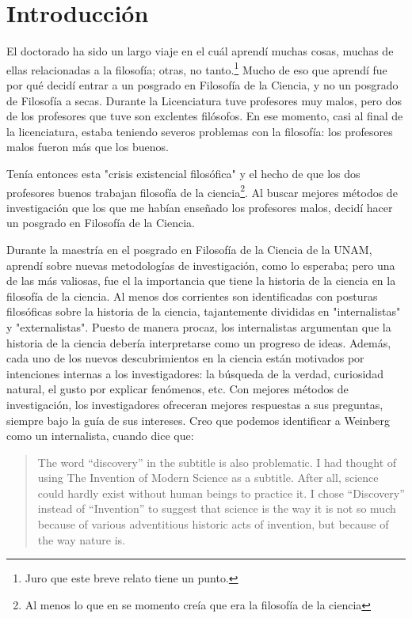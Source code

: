 
\chapter{Introducción}
\label{ch:introduction}

\dochaptoc %

El doctorado ha sido un largo viaje en el cuál aprendí muchas cosas, muchas de ellas relacionadas a la filosofía; otras, no tanto.\footnote{Juro que este breve relato tiene un punto.}
Mucho de eso que aprendí fue por qué decidí entrar a un posgrado en Filosofía de la Ciencia, y no un posgrado de Filosofía a secas.
Durante la Licenciatura tuve profesores muy malos, pero dos de los profesores que tuve son exclentes filósofos.
En ese momento, casi al final de la licenciatura, estaba teniendo severos problemas con la filosofía: los profesores malos fueron más que los buenos.

Tenía entonces esta "crisis existencial filosófica" y el hecho de que los dos profesores buenos trabajan filosofía de la ciencia\footnote{Al menos lo que en se momento creía que era la filosofía de la ciencia}.
Al buscar mejores métodos de investigación que los que me habían enseñado los profesores malos, decidí hacer un posgrado en Filosofía de la Ciencia.

Durante la maestría en el posgrado en Filosofía de la Ciencia de la UNAM, aprendí sobre nuevas metodologías de investigación, como lo esperaba; pero una de las más valiosas, fue el la importancia que tiene la historia de la ciencia en la filosofía de la ciencia.
Al menos dos corrientes son identificadas con posturas filosóficas sobre la historia de la ciencia, tajantemente divididas en "internalistas" y "externalistas".
Puesto de manera procaz, los internalistas argumentan que la historia de la ciencia debería interpretarse como un progreso de ideas.
Además, cada uno de los nuevos descubrimientos en la ciencia están motivados por intenciones internas a los investigadores: la búsqueda de la verdad, curiosidad natural, el gusto por explicar fenómenos, etc. 
Con mejores métodos de investigación, los investigadores ofreceran mejores respuestas a sus preguntas, siempre bajo la guía de sus intereses.
Creo que podemos identificar a Weinberg como un internalista, cuando dice que: 

\begin{quote}
	The word “discovery” in the subtitle is also problematic. I had thought of using The Invention of Modern Science as a subtitle. After all, science could hardly exist without human beings to practice it. I chose “Discovery” instead of “Invention” to suggest that science is the way it is not so much because of various adventitious historic acts of invention, but because of the way nature is. \parencite{Weinberg2015}
\end{quote}

